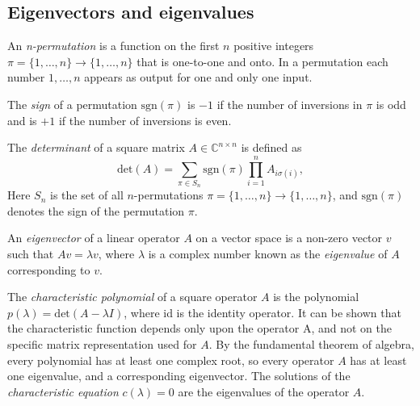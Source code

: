 \subsection{Eigenvectors and  eigenvalues}

\begin{definition}
  An \emph{n-permutation} is a function on the first $n$ positive integers  $\pi = \{1,\ldots,n\} \rightarrow  \{1,\ldots,n\} $ that is one-to-one and onto. In a permutation each number $1,\dots, n$ appears as output for one and only one input.
\end{definition}

\begin{definition}
  The \emph{sign} of a permutation $\text{sgn}(\pi)$ is $-1$ if the number of
inversions in $\pi$ is odd and is $+1$ if the number of inversions is even.
\end{definition}


\begin{definition}
  The \emph{determinant} of a square matrix $A \in \mathbb{C}^{n\times n}$ is defined as
  \begin{equation*}
    \text{det}(A) = \sum_{\pi \in S_n} \text{sgn}(\pi) \prod_{i=1}^{n} A_{i\sigma(i)},
  \end{equation*}
  Here $S_n$ is the set of all $n$-permutations $\pi = \{1,\ldots,n\} \rightarrow  \{1,\ldots,n\} $, and $\text{sgn}(\pi) $  denotes the sign of the permutation $\pi$.
\end{definition}

\begin{definition}
An \emph{eigenvector} of a linear operator $A$ on a vector space is a non-zero vector $v$ such that $A v  = \lambda v $, where $\lambda$ is a complex number known as the \emph{eigenvalue} of $A$ corresponding to $v$.
\end{definition}

The \emph{characteristic polynomial} of a square operator $A$ is the polynomial $p(\lambda) = \text{det}(A - \lambda I)$, where \gls{id} is the identity operator. It can be shown that the characteristic
function depends only upon the operator A, and not on the specific matrix representation used for $A$. By the fundamental theorem of algebra, every polynomial has at least one complex root, so every operator $A$ has at least one eigenvalue, and a corresponding
eigenvector. The solutions of the \emph{characteristic equation} $c(\lambda) = 0$ are the eigenvalues of the operator $A$. %

